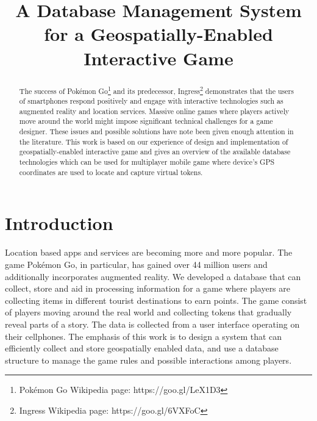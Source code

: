 \documentclass[conference]{IEEEtran}
\begin{document}
\title{A Database Management System for a Geospatially-Enabled Interactive Game}
\author{
\and
{}
\and
{}
\and
{}
}

\maketitle

\begin{abstract}
The success of Pokémon Go\footnote[1]{Pokémon Go Wikipedia page: https://goo.gl/LeX1D3} and its predecessor, Ingress\footnote[2]{Ingress Wikipedia page: https://goo.gl/6VXFoC} demonstrates that the users of smartphones respond positively and engage with interactive technologies such as augmented reality and location services. Massive online games where players actively move around the world might impose significant technical challenges for a game designer. These issues and possible solutions have note been given enough attention in the literature. This work is based on our experience of design and implementation of geospatially-enabled interactive game and gives an overview of the available database technologies which can be used for multiplayer mobile game where device's GPS coordinates are used to locate and capture virtual tokens. 
\end{abstract}

\IEEEpeerreviewmaketitle

\section{Introduction}
Location based apps and services are becoming more and more popular. The game Pokémon Go, in particular, has gained over 44 million users and additionally incorporates augmented reality. We developed a database that can collect, store and aid in processing information for a game where players are collecting items in different tourist destinations to earn points. The game consist of players moving around the real world and collecting tokens that gradually reveal parts of a story. The data is collected from a user interface operating on their cellphones. The emphasis of this work is to design a system that can efficiently collect and store geospatially enabled data, and use a database structure to manage the game rules and possible interactions among players. 
\end{document}
